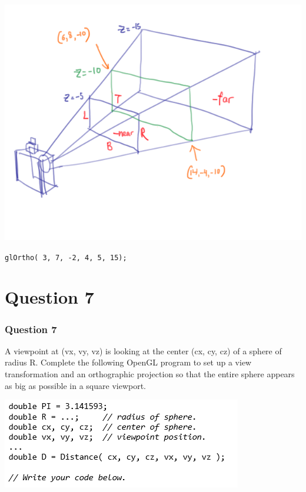 \documentclass{beamer}
\begin{document}
\begin{frame}

    \begin{center}
        \includegraphics[scale=1.2]{glFrustum-demo.png}
    \end{center}

    \begin{tcolorbox}[colback=violet!5!white]
        \begin{center}
            \texttt{glOrtho( 3, 7, -2, 4, 5, 15);}
        \end{center}
    \end{tcolorbox}

\end{frame}

\section{Question 7}

\begin{frame}
    \frametitle{Question 7}
    A viewpoint at (vx, vy, vz) is looking at the center (cx, cy, cz) 
    of a sphere of radius R. Complete the following OpenGL program to 
    set up a view transformation and an orthographic projection 
    so that the entire sphere appears as big as possible in a 
    square viewport.

    \vspace{1em}

    \includegraphics[]{q7-qn.png}
    

\end{frame}
\end{document}
